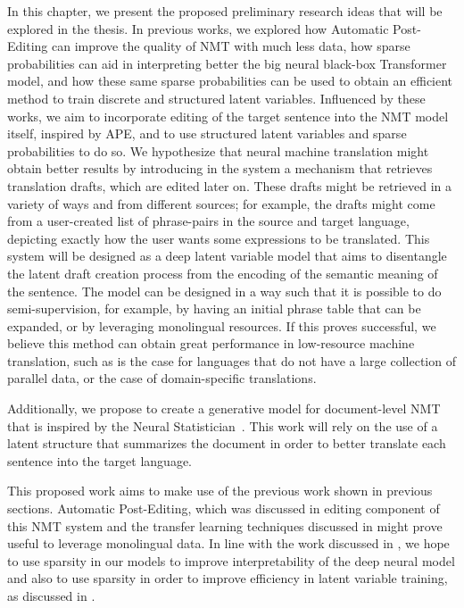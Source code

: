 In this chapter, we present the proposed preliminary research ideas
that will be explored in the thesis. In previous works, we explored
how Automatic Post-Editing can improve the quality of NMT with much
less data, how sparse probabilities can aid in interpreting better
the big neural black-box Transformer model, and how these same sparse
probabilities can be used to obtain an efficient method to train
discrete and structured latent variables. Influenced by these works,
we aim to incorporate editing of the target sentence into the NMT
model itself, inspired by APE, and to use structured latent variables
and sparse probabilities to do so. We hypothesize that neural machine
translation might obtain better results by introducing in the system
a mechanism that retrieves translation drafts, which
are edited later on. These drafts might be retrieved in a variety of
ways and from different sources; for example, the drafts might come
from a user-created list of phrase-pairs in the source and target
language, depicting exactly how the user wants some expressions to be
translated. This system will be designed as a deep latent variable
model that aims to disentangle the latent draft creation process from
the encoding of the semantic meaning of the sentence. The model can
be designed in a way such that it is possible to do semi-supervision,
for example, by having an initial phrase table that can be expanded,
or by leveraging monolingual resources. If this proves successful, we
believe this method can obtain great performance in low-resource
machine translation, such as is the case for languages that do not
have a large collection of parallel data, or the case of
domain-specific translations.

Additionally, we propose to create a generative model for
document-level NMT that is inspired by the Neural
Statistician~\citep{edwards2017prociclr}. This work will rely on the
use of a latent structure that summarizes the document in order to
better translate each sentence into the target language.

This proposed work aims to make use of the previous work shown in
previous sections. Automatic Post-Editing, which was discussed in
editing component of this NMT system and the transfer learning
techniques discussed in  might prove useful to leverage
monolingual data. In line with the work discussed in
, we hope to use sparsity in our models to
improve interpretability of the deep neural model and also to use
sparsity in order to improve efficiency in latent variable training,
as discussed in .

